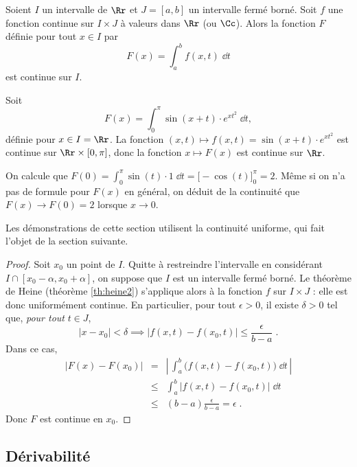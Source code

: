 \documentclass[class=report,crop=false]{standalone}
\begin{document}
\begin{theoreme}
\label{th:integralecontinue}
Soient $I$ un intervalle de $\Rr$ et $J=[a,b]$ un intervalle fermé borné. 
Soit $f$ une fonction continue sur $I\times J$ à valeurs dans $\Rr$ (ou $\Cc$). 
Alors la fonction $F$ définie pour tout $x\in I$ par
$$
F(x) = \int_a^b f(x,t)\;\dd t
$$ 
est continue sur $I$.

\end{theoreme}


\begin{exemple}
Soit 
$$F(x) = \int_0^{\pi} \sin (x+t) \cdot e^{xt^2} \; \dd t,$$ 
définie pour $x\in I = \Rr$.
La fonction $(x,t) \mapsto f(x,t) = \sin (x+t) \cdot e^{xt^2}$
est continue sur $\Rr \times [0,\pi]$, donc la fonction
$x \mapsto F(x)$ est continue sur $\Rr$.

\medskip

On calcule que $F(0) = \int_0^{\pi} \sin (t) \cdot 1 \; \dd t 
= \Big[-\cos(t)\Big]_0^{\pi}= 2$. Même si on n'a pas de formule
pour $F(x)$ en général, on déduit de la continuité que $F(x)\to F(0)=2$
lorsque $x\to0$.
\end{exemple}


Les démonstrations de cette section utilisent la continuité uniforme, qui fait l'objet
de la section suivante.

\begin{proof}
Soit $x_0$ un point de $I$. 
Quitte à restreindre l'intervalle en considérant $I \cap [x_0-\alpha,x_0+\alpha]$, 
on suppose que $I$ est un intervalle fermé borné.
Le théorème de Heine (théorème \ref{th:heine2}) s'applique alors à la fonction $f$
sur $I\times J$ : elle est donc uniformément
continue. En particulier, pour tout $\epsilon>0$, il existe $\delta>0$ tel
que, \emph{pour tout} $t\in J$,
$$|x-x_0|<\delta \implies \big|f(x,t)-f(x_0,t)\big| \le \frac{\epsilon}{b-a}\;.$$
Dans ce cas,
\begin{eqnarray*}
\big|F(x)-F(x_0)\big|&=&\displaystyle{\left|\,
\int_a^b \big(f(x,t)-f(x_0,t)\big)\;\dd t\,\right|}\\[1.5ex]
&\le& 
\displaystyle{
\int_a^b \big|f(x,t)-f(x_0,t)\big|\;\dd t}\\[1.5ex]
&\le&\displaystyle{ (b-a)\frac{\epsilon}{b-a} = \epsilon\;.}
\end{eqnarray*}
Donc $F$ est continue en $x_0$.
\end{proof}


\subsection{Dérivabilité}
\end{document}
